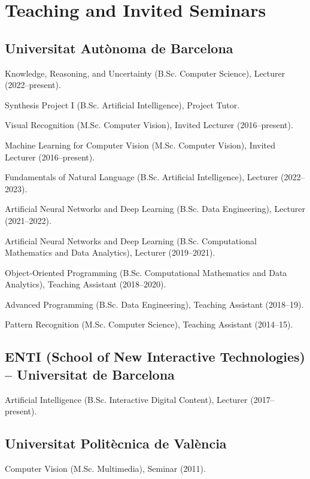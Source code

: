 \documentclass[11pt]{article}
\newenvironment{entries}{%
  \begin{list}{}{\setlength{\leftmargin}{3em}\setlength{\itemindent}{-1.5em}%
    \setlength{\itemsep}{0.35em}\setlength{\parsep}{0pt}\setlength{\topsep}{0.2em}}}%
  {\end{list}}
\begin{document}
\section*{Teaching and Invited Seminars}
\subsection*{Universitat Autònoma de Barcelona}
\begin{entries}
\item Knowledge, Reasoning, and Uncertainty (B.Sc. Computer Science), Lecturer (2022--present).
\item Synthesis Project I (B.Sc. Artificial Intelligence), Project Tutor.
\item Visual Recognition (M.Sc. Computer Vision), Invited Lecturer (2016--present).
\item Machine Learning for Computer Vision (M.Sc. Computer Vision), Invited Lecturer (2016--present).
\item Fundamentals of Natural Language (B.Sc. Artificial Intelligence), Lecturer (2022--2023).
\item Artificial Neural Networks and Deep Learning (B.Sc. Data Engineering), Lecturer (2021--2022).
\item Artificial Neural Networks and Deep Learning (B.Sc. Computational Mathematics and Data Analytics), Lecturer (2019--2021).
\item Object-Oriented Programming (B.Sc. Computational Mathematics and Data Analytics), Teaching Assistant (2018--2020).
\item Advanced Programming (B.Sc. Data Engineering), Teaching Assistant (2018--19).
\item Pattern Recognition (M.Sc. Computer Science), Teaching Assistant (2014--15).
\end{entries}

\subsection*{ENTI (School of New Interactive Technologies) -- Universitat de Barcelona}
\begin{entries}
\item Artificial Intelligence (B.Sc. Interactive Digital Content), Lecturer (2017--present).
\end{entries}

\subsection*{Universitat Politècnica de València}
\begin{entries}
\item Computer Vision (M.Sc. Multimedia), Seminar (2011).
\end{entries}
\end{document}
